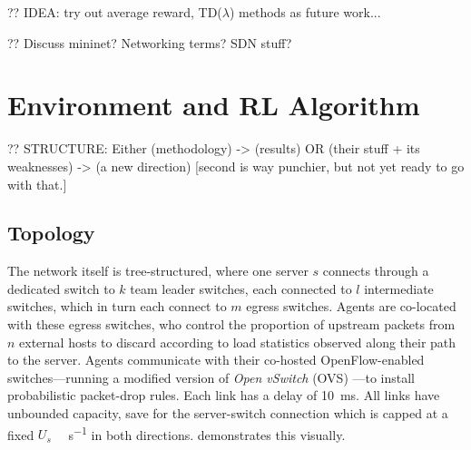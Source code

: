 \documentclass[conference, letterpaper, 10pt, times]{IEEEtran}
\begin{document}
?? IDEA: try out average reward, TD($\lambda$) methods as future work...

?? Discuss mininet? Networking terms? SDN stuff?

%

\section{Environment and RL Algorithm}

?? STRUCTURE: Either (methodology) -> (results) OR (their stuff + its weaknesses) -> (a new direction) [second is way punchier, but not yet ready to go with that.]

\subsection{Topology}
The network itself is tree-structured, where one server $s$ connects through a dedicated switch to $k$ team leader switches, each connected to $l$ intermediate switches, which in turn each connect to $m$ egress switches.
Agents are co-located with these egress switches, who control the proportion of upstream packets from $n$ external hosts to discard according to load statistics observed along their path to the server.
Agents communicate with their co-hosted OpenFlow-enabled switches---running a modified version of \emph{Open vSwitch} (OVS) \cite{open-vswitch}---to install probabilistic packet-drop rules.
Each link has a delay of \SI{10}{\milli\second}.
All links have unbounded capacity, save for the server-switch connection which is capped at a fixed $U_s$ \si{\mega\bit\per\second} in both directions.
 demonstrates this visually.
\end{document}
